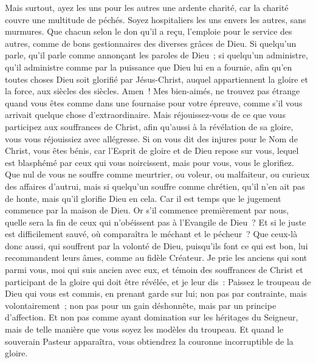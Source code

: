 \begin{multicols}{2}
Mais surtout, ayez les uns pour les autres une ardente charité, car la charité couvre une multitude de péchés.
Soyez hospitaliers les uns envers les autres, sans murmures. 
Que chacun selon le don qu'il a reçu, l'emploie pour le service des autres, comme de bons gestionnaires des diverses grâces de Dieu. 
Si quelqu'un parle, qu'il parle comme annonçant les paroles de Dieu~; si quelqu'un administre, qu'il administre comme par la puissance que Dieu lui en a fournie, afin qu'en toutes choses Dieu soit glorifié par Jésus-Christ, auquel appartiennent la gloire et la force, aux siècles des siècles. Amen~! 
Mes bien-aimés, ne trouvez pas étrange quand vous êtes comme dans une fournaise pour votre épreuve, comme s'il vous arrivait quelque chose d'extraordinaire. 
Mais réjouissez-vous de ce que vous participez aux souffrances de Christ, afin qu'aussi à la révélation de sa gloire, vous vous réjouissiez avec allégresse.
Si on vous dit des injures pour le Nom de Christ, vous êtes bénis, car l'Esprit de gloire et de Dieu repose sur vous, lequel est blasphémé par ceux qui vous noircissent, mais pour vous, vous le glorifiez.
Que nul de vous ne souffre comme meurtrier, ou voleur, ou malfaiteur, ou curieux des affaires d'autrui,
mais si quelqu'un souffre comme chrétien, qu'il n'en ait pas de honte, mais qu'il glorifie Dieu en cela.
Car il est temps que le jugement commence par la maison de Dieu. Or s'il commence premièrement par nous, quelle sera la fin de ceux qui n'obéissent pas à l'Evangile de Dieu~?
Et si le juste est difficilement sauvé, où comparaîtra le méchant et le pécheur~? 
Que ceux-là donc aussi, qui souffrent par la volonté de Dieu, puisqu'ils font ce qui est bon, lui recommandent leurs âmes, comme au fidèle Créateur. 
\VerseOne{}Je prie les anciens qui sont parmi vous, moi qui suis ancien avec eux, et témoin des souffrances de Christ et participant de la gloire qui doit être révélée, et je leur dis~: 
Paissez le troupeau de Dieu qui vous est commis, en prenant garde sur lui; non pas par contrainte, mais volontairement~; non pas pour un gain déshonnête, mais par un principe d'affection. 
Et non pas comme ayant domination sur les héritages du Seigneur, mais de telle manière que vous soyez les modèles du troupeau. 
Et quand le souverain Pasteur apparaîtra, vous obtiendrez la couronne incorruptible de la gloire.

\end{multicols}
